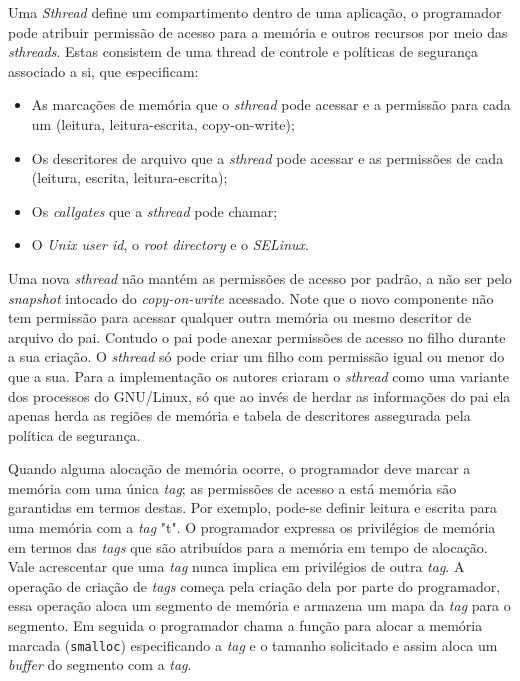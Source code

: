 Uma \emph{Sthread} define um compartimento dentro de uma aplicação, o
programador pode atribuir permissão de acesso para a memória e outros recursos
por meio das \emph{sthreads}. Estas consistem de uma thread de controle e
políticas de segurança associado a si, que especificam:

\begin{itemize}
	\item As marcações de memória que o \emph{sthread} pode acessar e a permissão
				para cada um (leitura, leitura-escrita, copy-on-write);
	\item Os descritores de arquivo que a \emph{sthread} pode acessar e as
				permissões de cada (leitura, escrita, leitura-escrita);
	\item Os \emph{callgates} que a \emph{sthread} pode chamar;
	\item O \emph{Unix user id}, o \emph{root directory} e o \emph{SELinux}.
\end{itemize}

Uma nova \emph{sthread} não mantém as permissões de acesso por padrão, a não
ser pelo \emph{snapshot} intocado do \emph{copy-on-write} acessado. Note que o
novo componente não tem permissão para acessar qualquer outra memória ou mesmo
descritor de arquivo do pai. Contudo o pai pode anexar permissões de acesso no
filho durante a sua criação. O \emph{sthread} só pode criar um filho com
permissão igual ou menor do que a sua. Para a implementação os autores criaram
o \emph{sthread} como uma variante dos processos do GNU/Linux, só que ao invés
de herdar as informações do pai ela apenas herda as regiões de memória e tabela
de descritores assegurada pela política de segurança.

Quando alguma alocação de memória ocorre, o programador deve marcar a memória
com uma única \emph{tag}; as permissões de acesso a está memória são garantidas
em termos destas. Por exemplo, pode-se definir leitura e escrita para uma
memória com a \emph{tag} "t". O programador expressa os privilégios de memória
em termos das \emph{tags} que são atribuídos para a memória em tempo de
alocação. Vale acrescentar que uma \emph{tag} nunca implica em privilégios de
outra \emph{tag}. A operação de criação de \emph{tags} começa pela criação dela
por parte do programador, essa operação aloca um segmento de memória e armazena
um mapa da \emph{tag} para o segmento. Em seguida o programador chama a função
para alocar a memória marcada (\texttt{smalloc}) especificando a \emph{tag} e o
tamanho solicitado e assim aloca um \emph{buffer} do segmento com a \emph{tag}.

